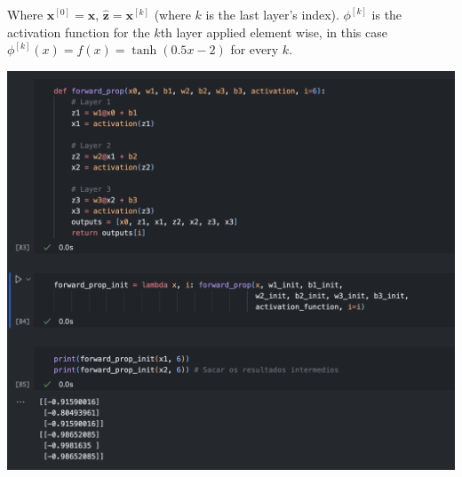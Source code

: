 \documentclass[12pt]{article}
\begin{document}
\begin{enumerate}[leftmargin=\labelsep]
    Where $\mathbf{x}^{[0]} = \mathbf{x}$, $\hat{\mathbf{z}} = \mathbf{x}^{[k]}$ (where $k$ is the last layer's index). $\phi^{[k]}$ is the activation function for the $k$th layer applied element wise, in this case $\phi^{[k]}(x) = f(x) =\tanh(0.5x-2)$ for every $k$.

    \begin{center}
        \includegraphics[scale=0.4]{images/code3.png}
    \end{center}


\end{enumerate}
\end{document}
